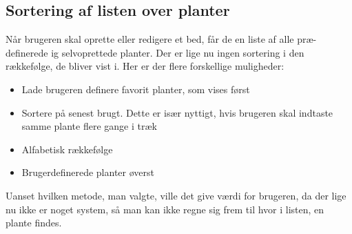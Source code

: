 \subsection{Sortering af listen over planter}
Når brugeren skal oprette eller redigere et bed, får de en liste af alle præ-definerede ig selvoprettede planter. Der er lige nu ingen sortering i den rækkefølge, de bliver vist i. Her er der flere forskellige muligheder:
\begin{itemize}
   \item Lade brugeren definere favorit planter, som vises først
   \item Sortere på senest brugt. Dette er især nyttigt, hvis brugeren skal indtaste samme plante flere gange i træk
   \item Alfabetisk rækkefølge
   \item Brugerdefinerede planter øverst
\end{itemize}

Uanset hvilken metode, man valgte, ville det give værdi for brugeren, da der lige nu ikke er noget system, så man kan ikke regne sig frem til hvor i listen, en plante findes.
